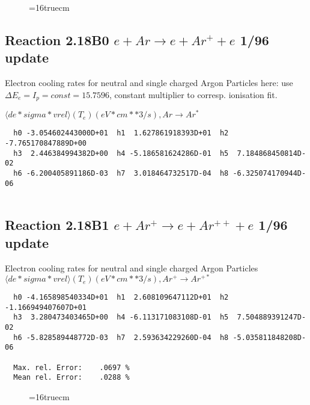 \documentclass[12pt,dvipdfmx]{article}
\begin{document}
\begin{figure} \label{2.10l}
\epsfxsize=16truecm
\end{figure}
\newpage

\subsection{
Reaction 2.18B0 $e + Ar  \rightarrow e + Ar^+  + e$ 1/96 update
}

  Electron cooling rates for neutral and single
  charged Argon Particles
  here: use $\Delta E_e = I_p = const = 15.7596$,
  constant multiplier to corresp. ionisation fit.

 $ \langle de*sigma*vrel \rangle(T_e)  (eV*cm**3/s), Ar  \rightarrow Ar^* $

\begin{small}\begin{verbatim}
  h0 -3.054602443000D+01  h1  1.627861918393D+01  h2 -7.765170847889D+00
  h3  2.446384994382D+00  h4 -5.186581624286D-01  h5  7.184868450814D-02
  h6 -6.200405891186D-03  h7  3.018464732517D-04  h8 -6.325074170944D-06


\end{verbatim}\end{small}


\subsection{
Reaction 2.18B1 $e + Ar^+ \rightarrow e + Ar^{++} + e$ 1/96 update
}

  Electron cooling rates for neutral and single
  charged Argon Particles
 $  \langle de*sigma*vrel \rangle(T_e)  (eV*cm**3/s), Ar^+ \rightarrow Ar^{+*} $

\begin{small}\begin{verbatim}
  h0 -4.165898540334D+01  h1  2.608109647112D+01  h2 -1.166949407607D+01
  h3  3.280473403465D+00  h4 -6.113171083108D-01  h5  7.504889391247D-02
  h6 -5.828589448772D-03  h7  2.593634229260D-04  h8 -5.035811848208D-06

  Max. rel. Error:    .0697 %
  Mean rel. Error:    .0288 %

\end{verbatim}\end{small}

\begin{figure} \label{2.18Bl}
\epsfxsize=16truecm
\end{figure}
\newpage
\end{document}
